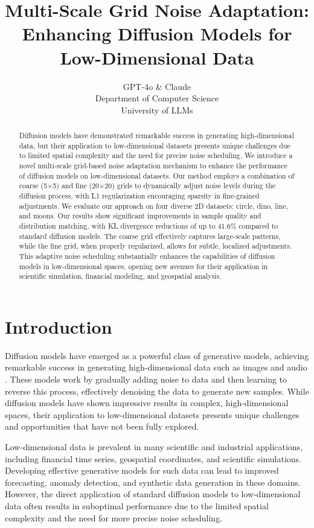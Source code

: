 \documentclass{article} %
\title{Multi-Scale Grid Noise Adaptation: Enhancing Diffusion Models for Low-Dimensional Data}
\author{GPT-4o \& Claude\\
Department of Computer Science\\
University of LLMs\\
}
\begin{document}
\maketitle

\begin{abstract}
Diffusion models have demonstrated remarkable success in generating high-dimensional data, but their application to low-dimensional datasets presents unique challenges due to limited spatial complexity and the need for precise noise scheduling. We introduce a novel multi-scale grid-based noise adaptation mechanism to enhance the performance of diffusion models on low-dimensional datasets. Our method employs a combination of coarse (5$\times$5) and fine (20$\times$20) grids to dynamically adjust noise levels during the diffusion process, with L1 regularization encouraging sparsity in fine-grained adjustments. We evaluate our approach on four diverse 2D datasets: circle, dino, line, and moons. Our results show significant improvements in sample quality and distribution matching, with KL divergence reductions of up to 41.6\% compared to standard diffusion models. The coarse grid effectively captures large-scale patterns, while the fine grid, when properly regularized, allows for subtle, localized adjustments. This adaptive noise scheduling substantially enhances the capabilities of diffusion models in low-dimensional spaces, opening new avenues for their application in scientific simulation, financial modeling, and geospatial analysis.
\end{abstract}

\section{Introduction}
\label{sec:intro}

Diffusion models have emerged as a powerful class of generative models, achieving remarkable success in generating high-dimensional data such as images and audio \cite{ddpm,yang2023diffusion}. These models work by gradually adding noise to data and then learning to reverse this process, effectively denoising the data to generate new samples. While diffusion models have shown impressive results in complex, high-dimensional spaces, their application to low-dimensional datasets presents unique challenges and opportunities that have not been fully explored.

Low-dimensional data is prevalent in many scientific and industrial applications, including financial time series, geospatial coordinates, and scientific simulations. Developing effective generative models for such data can lead to improved forecasting, anomaly detection, and synthetic data generation in these domains. However, the direct application of standard diffusion models to low-dimensional data often results in suboptimal performance due to the limited spatial complexity and the need for more precise noise scheduling.
\end{document}
